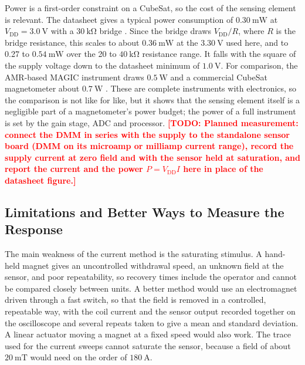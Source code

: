 \documentclass[12pt,a4paper]{article}
\newcommand{\todo}[1]{\textcolor{red}{\textbf{[TODO: #1]}}}
\begin{document}
Power is a first-order constraint on a CubeSat, so the cost of the sensing element is relevant. The datasheet gives a typical power consumption of $\SI{0.30}{\milli\watt}$ at $V_{\text{DD}} = \SI{3.0}{\volt}$ with a $\SI{30}{\kilo\ohm}$ bridge \cite{ct100_datasheet}. Since the bridge draws $V_{\text{DD}}/R$, where $R$ is the bridge resistance, this scales to about $\SI{0.36}{\milli\watt}$ at the $\SI{3.30}{\volt}$ used here, and to 0.27 to $\SI{0.54}{\milli\watt}$ over the 20 to $\SI{40}{\kilo\ohm}$ resistance range. It falls with the square of the supply voltage down to the datasheet minimum of $\SI{1.0}{\volt}$. For comparison, the AMR-based MAGIC instrument draws $\SI{0.5}{\watt}$ \cite{magic-radcube} and a commercial CubeSat magnetometer about $\SI{0.7}{\watt}$ \cite{nss_magnetometer}. These are complete instruments with electronics, so the comparison is not like for like, but it shows that the sensing element itself is a negligible part of a magnetometer's power budget; the power of a full instrument is set by the gain stage, ADC and processor. \todo{Planned measurement: connect the DMM in series with the supply to the standalone sensor board (DMM on its microamp or milliamp current range), record the supply current at zero field and with the sensor held at saturation, and report the current and the power $P = V_{\text{DD}} I$ here in place of the datasheet figure.}

\subsection{Limitations and Better Ways to Measure the Response}
\label{sec:disc-limitations}

The main weakness of the current method is the saturating stimulus. A hand-held magnet gives an uncontrolled withdrawal speed, an unknown field at the sensor, and poor repeatability, so recovery times include the operator and cannot be compared closely between units. A better method would use an electromagnet driven through a fast switch, so that the field is removed in a controlled, repeatable way, with the coil current and the sensor output recorded together on the oscilloscope and several repeats taken to give a mean and standard deviation. A linear actuator moving a magnet at a fixed speed would also work. The trace used for the current sweeps cannot saturate the sensor, because a field of about $\SI{20}{\milli\tesla}$ would need on the order of $\SI{180}{\ampere}$.
\end{document}
